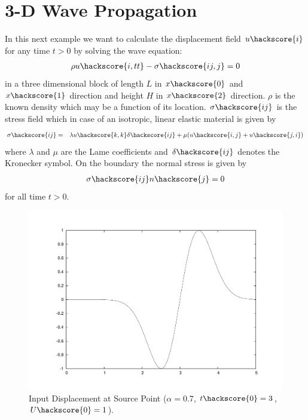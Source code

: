
%
%
%


\section{3-D Wave Propagation}
\label{WAVE CHAP}

In this next example we want to calculate the displacement field $u\hackscore{i}$ for any time $t>0$ by solving the wave equation:
\begin{eqnarray}\label{WAVE general problem}
\rho u\hackscore{i,tt} - \sigma\hackscore{ij,j}=0
\end{eqnarray}
in a three dimensional block of length $L$ in $x\hackscore{0}$
and $x\hackscore{1}$ direction and height $H$
in $x\hackscore{2}$ direction. $\rho$ is the known density which may be a function of its location.
$\sigma\hackscore{ij}$ is the stress field  which in case of an isotropic, linear elastic material is given by
\begin{eqnarray} \label{WAVE stress}
\sigma\hackscore{ij} & = & \lambda u\hackscore{k,k} \delta\hackscore{ij} + \mu ( u\hackscore{i,j} + u\hackscore{j,i})
\end{eqnarray}
where $\lambda$ and $\mu$ are the Lame coefficients 
 and $\delta\hackscore{ij}$ denotes the Kronecker symbol.
On the boundary the normal stress is given by
\begin{eqnarray} \label{WAVE natural}
\sigma\hackscore{ij}n\hackscore{j}=0
\end{eqnarray}
for all time $t>0$.

\begin{figure}[t!]
\centerline{\includegraphics[angle=-90,width=4.in]{figures/waveu}}
\caption{Input Displacement at Source Point ($\alpha=0.7$, $t\hackscore{0}=3$, $U\hackscore{0}=1$).}
\label{WAVE FIG 1.2}
\end{figure}


